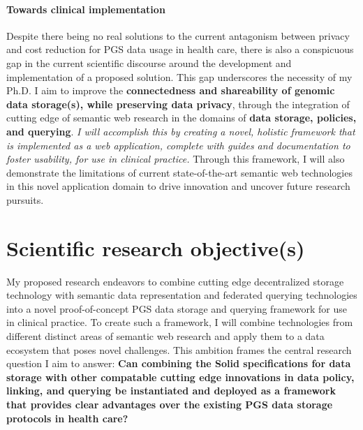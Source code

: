 \documentclass[a4paper,11pt]{article}
\begin{document}
\begin{refsection}
\paragraph{Towards clinical implementation}
Despite there being no real solutions to the current antagonism between privacy and cost reduction for PGS data usage in health care, there is also a conspicuous gap in the current scientific discourse around the development and implementation of a proposed solution. 
This gap underscores the necessity of my Ph.D.
I aim to improve the \textbf{connectedness and shareability of genomic data storage(s), while preserving data privacy}, through the integration of cutting edge of semantic web research in the domains of \textbf{data storage, policies, and querying}.
\emph{I will accomplish this by creating a novel, holistic framework that is implemented as a web application, complete with guides and documentation to foster usability, for use in clinical practice.}
Through this framework, I will also demonstrate the limitations of current state-of-the-art semantic web technologies in this novel application domain to drive innovation and uncover future research pursuits.


\section{Scientific research objective(s)}

\begin{comment}
Describe explicitly the scientific objective(s) and the research hypothesis. 
Explain whether and how the research is specifically challenging and inventive, describing in particular the innovative aspects of the envisaged results. 
Discuss in detail the results (or partial results) that you aim to achieve, such as specific knowledge, the solution to particular problems and academic breakthroughs.
\end{comment}
\smallskip

\noindent
My proposed research endeavors to combine cutting edge decentralized storage technology with semantic data representation and federated querying technologies into a novel proof-of-concept PGS data storage and querying framework for use in clinical practice. 
To create such a framework, I will combine technologies from different distinct areas of semantic web research and apply them to a data ecosystem that poses novel challenges.
This ambition frames the central research question I aim to answer: \textbf{Can combining the Solid specifications for data storage with other compatable cutting edge innovations in data policy, linking, and querying be instantiated and deployed as a framework that provides clear advantages over the existing PGS data storage protocols in health care?}


\end{refsection}
\end{document}
